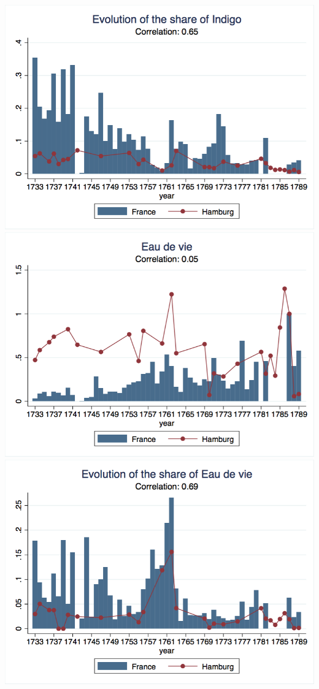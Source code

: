 \documentclass[12pt,a4paper,titlepage,english]{article}
\begin{document}
\includegraphics[scale=.28]{indigo_share_long.png}\\
\includegraphics[scale=.28]{eaudevie_long.png}
\includegraphics[scale=.28]{eaudevie_share_long.png}\\
\end{document}
